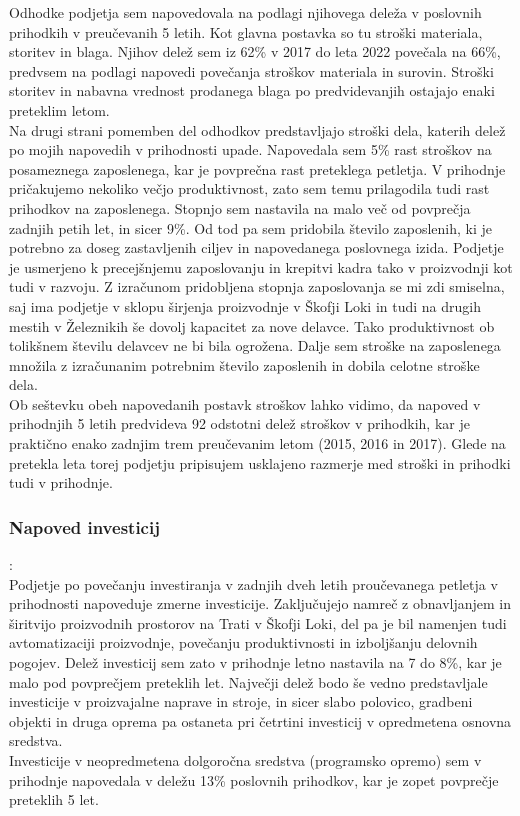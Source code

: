\documentclass[12pt,a4paper]{amsart}
\theoremstyle{definition} %
\theoremstyle{plain} %
\begin{document}
Odhodke podjetja sem napovedovala na podlagi njihovega deleža v poslovnih prihodkih v preučevanih 5 letih. Kot glavna postavka so tu stroški materiala, storitev in blaga. Njihov delež sem iz 62\% v 2017 do leta 2022 povečala na 66\%, predvsem na podlagi napovedi povečanja stroškov materiala in surovin. Stroški storitev in nabavna vrednost prodanega blaga po predvidevanjih ostajajo enaki preteklim letom.\\
Na drugi strani pomemben del odhodkov predstavljajo stroški dela, katerih delež po mojih napovedih v prihodnosti upade. Napovedala sem 5\% rast stroškov na posameznega zaposlenega, kar je povprečna rast preteklega petletja. V prihodnje pričakujemo nekoliko večjo produktivnost, zato sem temu prilagodila tudi rast prihodkov na zaposlenega. Stopnjo sem nastavila na malo več od povprečja zadnjih petih let, in sicer 9\%. Od tod pa sem pridobila število zaposlenih, ki je potrebno za doseg zastavljenih ciljev in napovedanega poslovnega izida. Podjetje je usmerjeno k precejšnjemu zaposlovanju in krepitvi kadra tako v proizvodnji kot tudi v razvoju. Z izračunom pridobljena stopnja zaposlovanja se mi zdi smiselna, saj ima podjetje v sklopu širjenja proizvodnje v Škofji Loki in tudi na drugih mestih v Železnikih še dovolj kapacitet za nove delavce. Tako produktivnost ob tolikšnem številu delavcev ne bi bila ogrožena. Dalje sem stroške na zaposlenega množila z izračunanim potrebnim število zaposlenih in dobila celotne stroške dela.  \\
Ob seštevku obeh napovedanih postavk stroškov lahko vidimo, da napoved v prihodnjih 5 letih predvideva 92 odstotni delež stroškov v prihodkih, kar je praktično enako zadnjim trem preučevanim letom (2015, 2016 in 2017). Glede na pretekla leta torej podjetju pripisujem usklajeno razmerje med stroški in prihodki tudi v prihodnje.\\


\subsubsection{Napoved investicij}:\\

Podjetje po povečanju investiranja v zadnjih dveh letih proučevanega petletja v prihodnosti napoveduje zmerne investicije. Zaključujejo namreč z obnavljanjem in širitvijo proizvodnih prostorov na Trati v Škofji Loki, del pa je bil namenjen tudi avtomatizaciji proizvodnje, povečanju produktivnosti in izboljšanju delovnih pogojev. Delež investicij sem zato v prihodnje letno nastavila na 7 do 8\%, kar je malo pod povprečjem preteklih let. Največji delež bodo še vedno predstavljale investicije v proizvajalne naprave in stroje, in sicer slabo polovico, gradbeni objekti in druga oprema pa ostaneta pri četrtini investicij v opredmetena osnovna sredstva.\\
Investicije v neopredmetena dolgoročna sredstva (programsko opremo) sem v prihodnje napovedala v deležu 13\% poslovnih prihodkov, kar je zopet povprečje preteklih 5 let.\\
\end{document}
